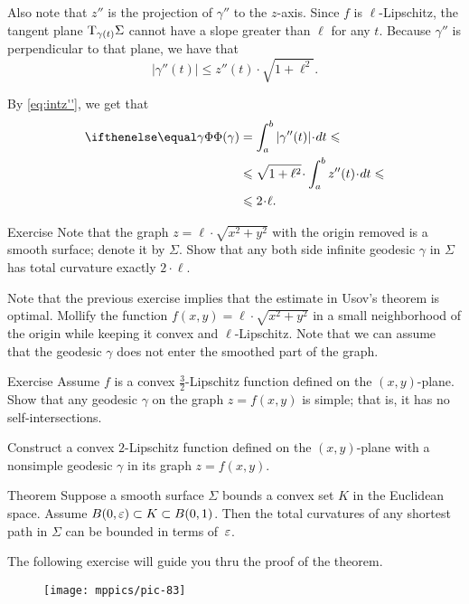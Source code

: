 Also note that $z''$ is the projection of $\gamma''$ to the $z$-axis.
Since $f$ is $\ell$-Lipschitz, the tangent plane $\mathrm{T}_{\gamma (t)} \Sigma$ cannot have a slope greater than $\ell$ for any $t$.
Because $\gamma ''$ is perpendicular to that plane, we have that
\[|\gamma'' (t)|  \le  z''(t)\cdot\sqrt{1+ \ell ^2}.\]

By \ref{eq:intz''}, we get that
\begin{align*}
\tc\gamma&=\int_a^b|\gamma'' (t)|\cdot dt\le 
\\
&\le \sqrt{1+ \ell ^2}\cdot  \int_a^b z''(t)\cdot dt\le 
\\
&\le 2\cdot \ell.
\end{align*}
\qedsf

\begin{thm}{Exercise}\label{ex:usov-exact}
Note that the graph $z=\ell\cdot\sqrt{x^2+y^2}$ with the origin removed is a smooth surface; denote it by $\Sigma$.
Show that any both side infinite geodesic $\gamma$ in $\Sigma$ has total curvature exactly $2\cdot \ell$.
\end{thm}

Note that the previous exercise implies that the estimate in Usov's theorem is optimal. Mollify the function $f(x,y)=\ell\cdot\sqrt{x^2+y^2}$ in a small neighborhood of the origin while keeping it convex and $\ell$-Lipschitz. 
Note that we can assume that the geodesic $\gamma$ does not enter the smoothed part of the graph.


\begin{thm}{Exercise}\label{ex:rough-bound-mountain}
Assume $f$ is a convex $\tfrac32$-Lipschitz function defined on the $(x,y)$-plane.
Show that any geodesic $\gamma$ on the graph $z=f(x,y)$ is simple;
that is, it has no self-intersections.

Construct a convex $2$-Lipschitz function defined on the $(x,y)$-plane
with a nonsimple geodesic $\gamma$ in its graph $z=f(x,y)$.
\end{thm}


\begin{thm}{Theorem}\label{thm:tc-of-mingeod}
Suppose a smooth surface $\Sigma$ bounds a convex set $K$ in the Euclidean space.
Assume $B(0,\varepsilon)\subset K\subset B(0,1)$.
Then the total curvatures of any shortest path in $\Sigma$ can be bounded in terms of~$\varepsilon$. 
\end{thm}

The following exercise will guide you thru the proof of the theorem. 

\begin{wrapfigure}{r}{48 mm}
\vskip-0mm
\centering
\texttt{[image: mppics/pic-83]}
\vskip-0mm
\end{wrapfigure}

